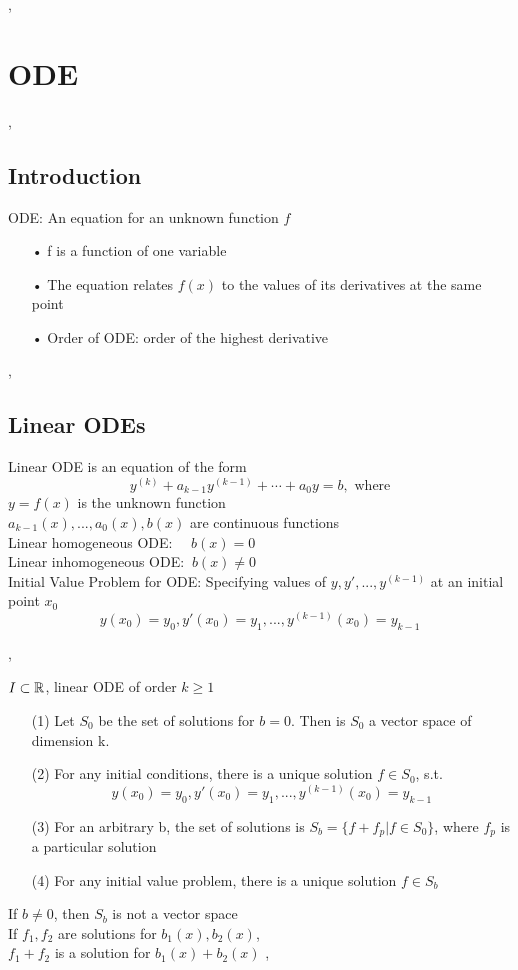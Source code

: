 \sep
\section{ODE}
\sep

\subsection{Introduction}
\Def ODE: An equation for an unknown function $f$
\begin{enumerate}
\item[•] f is a function of one variable
\item[•] The equation relates $f(x)$ to the values of its derivatives at the same point
\item[•] Order of ODE: order of the highest derivative
\end{enumerate}
\sep

\subsection{Linear ODEs}
\Def Linear ODE is an equation of the form
\[ y^{(k)} + a_{k - 1} y^{(k - 1)} + \cdots + a_0 y = b, \text{ where} \] 
$y = f(x)$ is the unknown function \\
$a_{k - 1}(x), ..., a_0(x), b(x)$ are continuous functions \\

\Def Linear homogeneous ODE: $ \quad b(x) = 0$ \\
\Def Linear inhomogeneous ODE: $ \ b(x) \neq 0$ \\

\Def Initial Value Problem for ODE: Specifying values of $y, y', ... , y^{(k - 1)}$ at an initial point $x_0$
\[y(x_0) = y_0, y'(x_0) = y_1, ..., y^{(k - 1)}(x_0) = y_{k - 1} \]

\sep

\Theorem[2.2.3] $I \subset \mathbb{R}$,  linear ODE of order $k \geq 1$
\begin{enumerate}
\item[(1)] Let $S_0$ be the set of solutions for $b = 0$. Then is $S_0$ a vector space of dimension k.
\item[(2)] For any initial conditions, there is a unique solution $f \in S_0$, s.t.
\[y(x_0) = y_0, y'(x_0) = y_1, ..., y^{(k - 1)}(x_0) = y_{k - 1} \]

\item[(3)] For an arbitrary b, the set of solutions is $S_b = \{f + f_p | f \in S_0\}$, where $f_p$ is a particular solution
\item[(4)] For any initial value problem, there is a unique solution $f \in S_b$
\end{enumerate}
\Bem If $b \neq 0$, then $S_b$ is not a vector space \\
\Bem If $f_1, f_2$ are solutions for $b_1(x), b_2(x)$, \\ $f_1 + f_2$ is a solution for $b_1(x) + b_2(x)$
\sep

